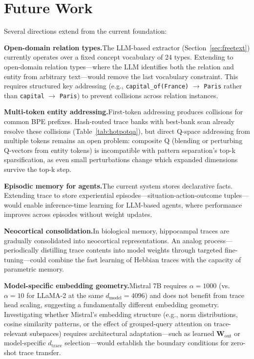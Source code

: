 \documentclass[11pt,a4paper]{article}
\begin{document}
\section{Future Work}

Several directions extend from the current foundation:

\textbf{Open-domain relation types.}\quad The LLM-based extractor (Section~\ref{sec:freetext}) currently operates over a fixed concept vocabulary of 24 types. Extending to open-domain relation types---where the LLM identifies both the relation and entity from arbitrary text---would remove the last vocabulary constraint. This requires structured key addressing (e.g., \texttt{capital\_of(France)} $\to$ \texttt{Paris} rather than \texttt{capital} $\to$ \texttt{Paris}) to prevent collisions across relation instances.

\textbf{Multi-token entity addressing.}\quad First-token addressing produces collisions for common BPE prefixes. Hash-routed trace banks with best-bank scan already resolve these collisions (Table~\ref{tab:hotpotqa}), but direct Q-space addressing from multiple tokens remains an open problem: composite Q (blending or perturbing Q-vectors from entity tokens) is incompatible with pattern separation's top-k sparsification, as even small perturbations change which expanded dimensions survive the top-k step.

\textbf{Episodic memory for agents.}\quad The current system stores declarative facts. Extending trace to store experiential episodes---situation-action-outcome tuples---would enable inference-time learning for LLM-based agents, where performance improves across episodes without weight updates.

\textbf{Neocortical consolidation.}\quad In biological memory, hippocampal traces are gradually consolidated into neocortical representations. An analog process---periodically distilling trace contents into model weights through targeted fine-tuning---could combine the fast learning of Hebbian traces with the capacity of parametric memory.

\textbf{Model-specific embedding geometry.}\quad Mistral 7B requires $\alpha{=}1000$ (vs.\ $\alpha{=}10$ for LLaMA-2 at the same $d_{\text{model}}{=}4096$) and does not benefit from trace head scaling, suggesting a fundamentally different embedding geometry. Investigating whether Mistral's embedding structure (e.g., norm distributions, cosine similarity patterns, or the effect of grouped-query attention on trace-relevant subspaces) requires architectural adaptation---such as learned $\mathbf{W}_{\text{out}}$ or model-specific $d_{\text{trace}}$ selection---would establish the boundary conditions for zero-shot trace transfer.
\end{document}
